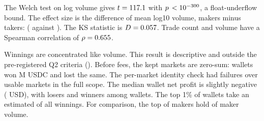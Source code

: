 The Welch test on log volume gives $t=117.1$ with $p\,<10^{-300}$, a float-underflow bound.
The effect size is the difference of mean log10 volume, makers minus takers: \RoleLogTenDiff{} (\RoleLogTenMaker{} against \RoleLogTenTaker).
The KS statistic is $D=0.057$.
Trade count and volume have a Spearman correlation of $\rho=0.655$.

Winnings are concentrated like volume.
This result is descriptive and outside the pre-registered Q2 criteria ().
Before fees, the kept markets are zero-sum: wallets won \PnlGrossWonM{} M USDC and lost the same.
The per-market identity check had \PnlNIdentityFailures{} failures over \PnlNMarketsChecked{} usable markets in the full scope.
The median wallet net profit is slightly negative (\PnlMedianNet{} USD), with \PnlNLosers{} losers and \PnlNWinners{} winners among \PnlNWallets{} wallets.
The top 1\% of wallets take an estimated \PnlTopOnePctShareWon{} of all winnings.
For comparison, the top \TopOneLabel{} of makers hold \MakerTopOneShare{} of maker volume.
